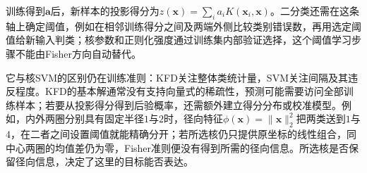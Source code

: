 训练得到$\bm a$后，新样本的投影得分为$z(\bm x)=\sum_i a_iK(\bm x_i,\bm x)$。二分类还需在这条轴上确定阈值，例如在相邻训练得分之间及两端外侧比较类别错误数，再用选定阈值给新输入判类；核参数和正则化强度通过训练集内部验证选择，这个阈值学习步骤不能由Fisher方向自动替代。

它与核SVM的区别仍在训练准则：KFD关注整体类统计量，SVM关注间隔及其违反程度。KFD的基本解通常没有支持向量式的稀疏性，预测可能需要访问全部训练样本；若要从投影得分得到后验概率，还需额外建立得分分布或校准模型。例如，内外两圈分别具有固定半径$1$与$2$时，径向特征$\phi(\bm x)=\|\bm x\|_2^2$把两类送到$1$与$4$，在二者之间设置阈值就能精确分开；若所选核仍只提供原坐标的线性组合，同中心两圈的均值差仍为零，Fisher准则便没有得到所需的径向信息。所选核是否保留径向信息，决定了这里的目标能否表达。
